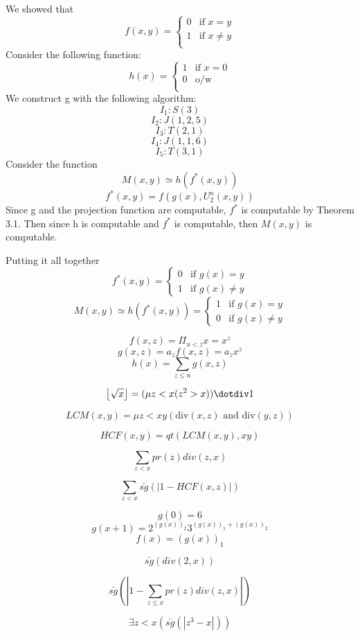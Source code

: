\begin{exe}[3.4.3]
We showed that 
\[f(x, y) = \begin{cases}
    0 & \text{if } x = y \\
    1 & \text{if } x \neq y \\
\end{cases}\]
Consider the following function:
\[h(x) = \begin{cases}
    1 & \text{if } x = 0 \\
    0 & \text{o/w}  \\
\end{cases}\]
We construct g with the following algorithm:
\[I_1: S(3)\]
\[I_2: J(1, 2, 5)\]
\[I_3: T(2, 1)\]
\[I_4: J(1, 1, 6)\]
\[I_5: T(3, 1)\]
Consider the function
\[M(x, y) \simeq h(f^*(x, y))\]
\[f^*(x, y) = f(g(x), U_2^n(x, y))\]
Since g and the projection function are computable, $f^*$ is computable by Theorem 3.1.
Then since h is computable and $f^*$ is computable, then $M(x,y)$ is computable.

Putting it all together
\[f^*(x, y) = \begin{cases}
    0 & \text{if } g(x) = y\\
    1 & \text{if } g(x) \neq y
\end{cases}\]
\[M(x, y) \simeq h(f^*(x, y)) = \begin{cases}
    1 & \text{if } g(x) = y\\
    0 & \text{if } g(x) \neq y
\end{cases}\]
\end{exe}
\begin{exe}[4.16.1a]
\[f(x, z) = \Pi_{u < z} x = x^z\]
\[g(x, z) = a_zf(x, z) = a_zx^z\]
\[h(x) = \sum_{z \leq n} g(x, z) \]
\end{exe}
\begin{exe}[4.16.1b]
\[\floor*{\sqrt{x}} = (\mu z < x(z^2 > x)) \dotdiv 1\]
\end{exe}
\begin{exe}[4.16.1c]
    \[LCM(x, y) = \mu z < xy (\text{div}(x, z) \text{ and } \text{div}(y, z))\]
\end{exe}
\begin{exe}[4.16.1d]
    \[HCF(x, y) = qt(LCM(x, y), xy)\]
\end{exe}
\begin{exe}[4.16.1e]
    \[\sum_{z < x} pr(z)div(z, x)\]
\end{exe}
\begin{exe}[4.16.1f]
    \[\sum_{z < x} \bar{sg}(|1 - HCF(x, z)|)\]
\end{exe}
\begin{exe}[4.16.3]
    \[g(0) = 6\]
    \[g(x + 1) = 2^{(g(x))_2}3^{(g(x))_1 + (g(x))_2}\]
    \[f(x) = (g(x))_1\]
\end{exe}
\begin{exe}[4.16.4a]
\[\bar{sg}(div(2, x))\]
\end{exe}
\begin{exe}[4.16.4b]
    \[\bar{sg}(|1 - \sum_{z \leq x} pr(z)div(z, x)|)\]
\end{exe}
\begin{exe}[4.16.4c]
    \[\exists z < x (\bar{sg}(|z^3 - x|))\]
\end{exe}

